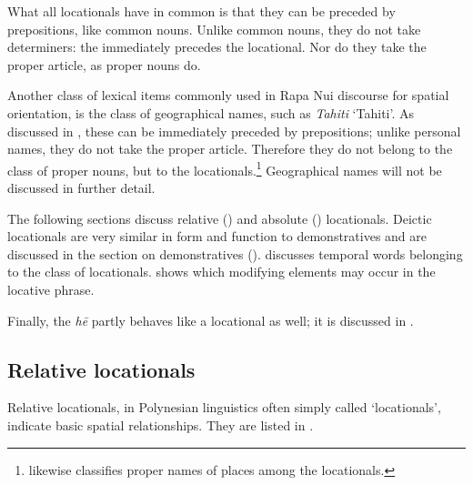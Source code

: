What all locationals have in common is that they can be preceded by prepositions, like common nouns. Unlike common nouns, they do not take determiners: the  immediately precedes the locational. Nor do they take the proper article, as proper nouns do.

Another class of lexical items commonly used in Rapa Nui discourse for spatial orientation, is the class of geographical names, such as \textit{Tahiti} ‘Tahiti’. As discussed in , these can be immediately preceded by prepositions; unlike personal names, they do not take the proper article. Therefore they do not belong to the class of proper nouns, but to the locationals.\footnote{\label{fn:140}\citet[54]{Clark1976} likewise classifies proper names of places among the locationals.}  Geographical names will not be discussed in further detail. 

The following sections discuss relative () and absolute () locationals. Deictic locationals are very similar in form and function to demonstratives and are discussed in the section on demonstratives ().  discusses temporal words belonging to the class of locationals.  shows which modifying elements may occur in the locative phrase.

Finally, the  \textit{hē} partly behaves like a locational as well; it is discussed in .

\subsection{Relative locationals}\label{sec:3.6.2}
Relative locationals, in Polynesian linguistics often simply called ‘locationals’, indicate basic spatial relationships. They are listed in . 

